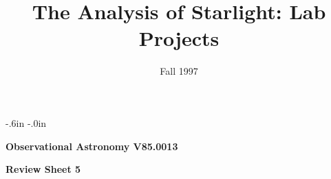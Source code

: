  
\topmargin -.6in 
\textheight 8.7in 
\oddsidemargin -.0in 
\textwidth 6.5in 
\title{The Analysis of Starlight: Lab Projects} 
\date{Fall 1997} 
 
\setcounter{page}{1} 
\setcounter{equation}{0} 
\pagestyle{empty} 
\parindent 0pt 
\parskip 8pt 
\def\arcsec{\ifmmode {^{\scriptscriptstyle\prime\prime}}
          \else $^{\scriptscriptstyle\prime\prime}$\fi}
\def\arcmin{\ifmmode {^{\scriptscriptstyle\prime}}
          \else $^{\scriptscriptstyle\prime}$\fi}
\def\deg{\ifmmode^\circ\else$^\circ$\fi}


   
 
\noindent 
{\bf Observational Astronomy      \hfill  V85.0013}\\ 

 
\bigskip 
 
\bigskip 
 
\noindent 
{\hfill \Large {\bf Review Sheet 5} \hfill} 
 
 
\bigskip 
 
